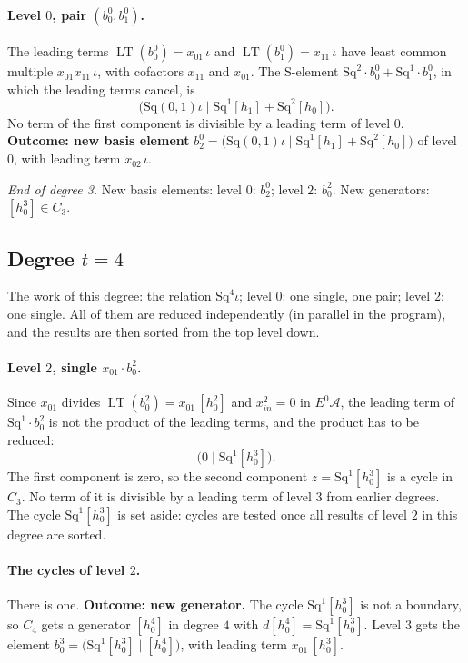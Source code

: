 \documentclass[11pt]{article}
\newcommand{\Sq}{\mathrm{Sq}}
\newcommand{\A}{\mathcal{A}}
\DeclareMathOperator{\LT}{LT}
\begin{document}
\paragraph{Level $0$, pair $(b^{0}_{0}, b^{0}_{1})$.} The leading terms $\LT(b^{0}_{0}) = x_{01}\,\iota$ and $\LT(b^{0}_{1}) = x_{11}\,\iota$ have least common multiple $x_{01}x_{11}\,\iota$, with cofactors $x_{11}$ and $x_{01}$. The S-element $\Sq^{2}\cdot b^{0}_{0} + \Sq^{1}\cdot b^{0}_{1}$, in which the leading terms cancel, is
\[\bigl(\Sq(0,1)\iota \;\big|\; \Sq^{1}[h_1] + \Sq^{2}[h_0]\bigr).\]
No term of the first component is divisible by a leading term of level $0$.
\textbf{Outcome: new basis element} $b^{0}_{2} = \bigl(\Sq(0,1)\iota \;\big|\; \Sq^{1}[h_1] + \Sq^{2}[h_0]\bigr)$ of level $0$, with leading term $x_{02}\,\iota$.
\medskip
\par\noindent\emph{End of degree 3.} New basis elements: level $0$: $b^{0}_{2}$; level $2$: $b^{2}_{0}$. New generators: $[h_0^3]\in C_{3}$.
\subsection*{Degree $t = 4$}
\noindent The work of this degree: the relation $\Sq^{4}\iota$; level $0$: one single, one pair; level $2$: one single. All of them are reduced independently (in parallel in the program), and the results are then sorted from the top level down.
\medskip
\paragraph{Level $2$, single $x_{01}\cdot b^{2}_{0}$.} Since $x_{01}$ divides $\LT(b^{2}_{0}) = x_{01}\,[h_0^2]$ and $x_{in}^2 = 0$ in $E^0\A$, the leading term of $\Sq^{1}\cdot b^{2}_{0}$ is not the product of the leading terms, and the product has to be reduced:
\[\bigl(0 \;\big|\; \Sq^{1}[h_0^3]\bigr).\]
The first component is zero, so the second component $z = \Sq^{1}[h_0^3]$ is a cycle in $C_{3}$.
No term of it is divisible by a leading term of level $3$ from earlier degrees.
The cycle $\Sq^{1}[h_0^3]$ is set aside: cycles are tested once all results of level $2$ in this degree are sorted.
\medskip
\paragraph{The cycles of level $2$.} There is one.
\textbf{Outcome: new generator.} The cycle $\Sq^{1}[h_0^3]$ is not a boundary, so $C_{4}$ gets a generator $[h_0^4]$ in degree $4$ with $d[h_0^4] = \Sq^{1}[h_0^3]$.
Level $3$ gets the element $b^{3}_{0} = \bigl(\Sq^{1}[h_0^3] \;\big|\; [h_0^4]\bigr)$, with leading term $x_{01}\,[h_0^3]$.
\medskip
\end{document}
